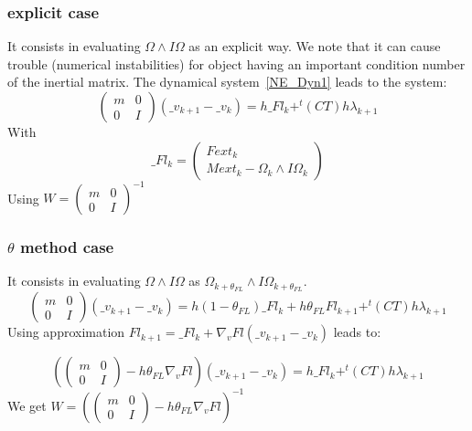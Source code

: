\subsubsection{explicit case}
It consists in evaluating $\Omega  \wedge I\Omega $ as an explicit way. We note that it can cause trouble (numerical instabilities) for object having an important condition number of the inertial matrix.
The dynamical system~\ref{NE_Dyn1} leads to the system:
\begin{equation}
  \left(\begin{array}{cc} m&0\\0&I\end{array}\right)
   (\_v_{k+1}-\_v_{k})=
   h \_Fl_k +
    ^t(CT) h\lambda _{k+1}
  \end{equation}
  With \[\_Fl_k = \left(\begin{array}{c} Fext_k\\ Mext_k - \Omega _k \wedge I\Omega _k \end{array}\right)\]
Using $W = \left(\begin{array}{cc} m&0\\0&I\end{array}\right) ^{-1} $

\subsubsection{$\theta$ method case}
It consists in evaluating $\Omega  \wedge I\Omega $ as $\Omega _{k+\theta _{FL}}  \wedge I\Omega _{k+\theta _{FL}} $.
\begin{equation}
  \left(\begin{array}{cc} m&0\\0&I\end{array}\right)
   (\_v_{k+1}-\_v_{k})=
   h (1-\theta _{FL})\_Fl_k + h \theta _{FL} Fl_{k+1} +
    ^t(CT) h\lambda _{k+1}
  \end{equation}
Using approximation $Fl_{k+1} = \_Fl_{k}+\nabla _v Fl (\_v_{k+1}-\_v_{k})$ leads to:

\begin{equation}
  \left(\left(\begin{array}{cc} m&0\\0&I\end{array}\right)-h\theta _{FL}\nabla _v Fl\right)
   (\_v_{k+1}-\_v_{k})=
   h \_Fl_k + ^t(CT) h\lambda _{k+1}
  \end{equation}
We get $W =  \left(\left(\begin{array}{cc} m&0\\0&I\end{array}\right)-h\theta _{FL}\nabla _v Fl\right)^{-1} $

